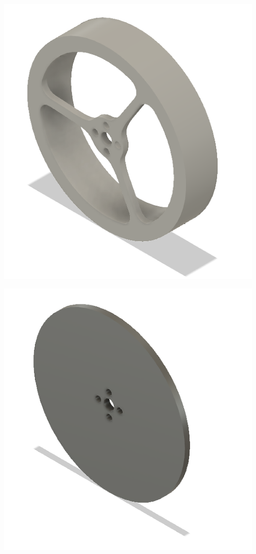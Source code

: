\documentclass[12pt,letterpaper]{article}
\begin{document}
\begin{appendices}
\includegraphics[width=\textwidth]{images/reactionWheel.png} 
    \label{reactionWheel}

\includegraphics[width=\textwidth]{images/simpleReactionWheel.png} 
    \label{simpleReactionWheel}

\end{appendices}
\end{document}
